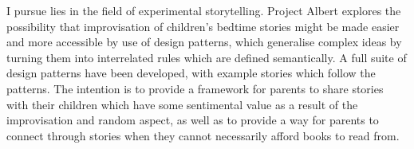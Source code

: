 \bigskip
{} I pursue lies in the field of experimental storytelling. Project Albert explores the possibility that improvisation of children's bedtime stories might be made easier and more accessible by use of design patterns, which generalise complex ideas by turning them into interrelated rules which are defined semantically. A full suite of design patterns have been developed, with example stories which follow the patterns. The intention is to provide a framework for parents to share stories with their children which have some sentimental value as a result of the improvisation and random aspect, as well as to provide a way for parents to connect through stories when they cannot necessarily afford books to read from. 




